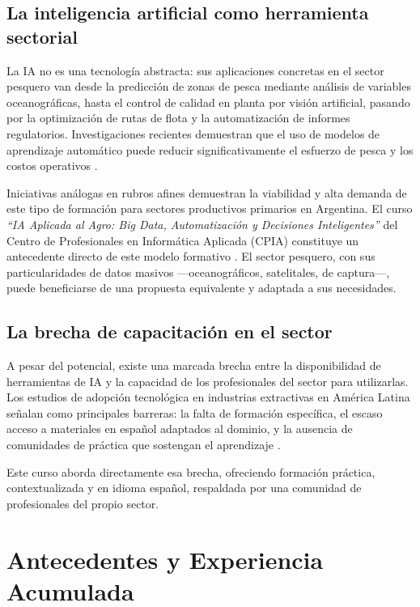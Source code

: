 \documentclass[12pt,a4paper]{article}
\begin{document}
\subsection{La inteligencia artificial como herramienta sectorial}

La IA no es una tecnología abstracta: sus aplicaciones concretas en el sector pesquero van desde la predicción de zonas de pesca mediante análisis de variables oceanográficas, hasta el control de calidad en planta por visión artificial, pasando por la optimización de rutas de flota y la automatización de informes regulatorios. Investigaciones recientes demuestran que el uso de modelos de aprendizaje automático puede reducir significativamente el esfuerzo de pesca y los costos operativos \parencite{Kroodsma2018}.

Iniciativas análogas en rubros afines demuestran la viabilidad y alta demanda de este tipo de formación para sectores productivos primarios en Argentina. El curso \textit{``IA Aplicada al Agro: Big Data, Automatización y Decisiones Inteligentes''} del Centro de Profesionales en Informática Aplicada (CPIA) constituye un antecedente directo de este modelo formativo \parencite{CPIA2026}. El sector pesquero, con sus particularidades de datos masivos ---oceanográficos, satelitales, de captura---, puede beneficiarse de una propuesta equivalente y adaptada a sus necesidades.

\subsection{La brecha de capacitación en el sector}

A pesar del potencial, existe una marcada brecha entre la disponibilidad de herramientas de IA y la capacidad de los profesionales del sector para utilizarlas. Los estudios de adopción tecnológica en industrias extractivas en América Latina señalan como principales barreras: la falta de formación específica, el escaso acceso a materiales en español adaptados al dominio, y la ausencia de comunidades de práctica que sostengan el aprendizaje \parencite{CEPAL2021, BID2020}.

Este curso aborda directamente esa brecha, ofreciendo formación práctica, contextualizada y en idioma español, respaldada por una comunidad de profesionales del propio sector.

\section{Antecedentes y Experiencia Acumulada}
\end{document}
